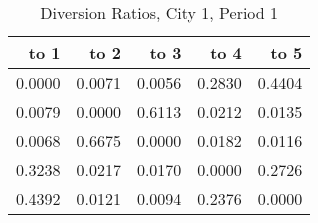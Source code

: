\begin{table}[htbp]
    \centering
    \caption{Diversion Ratios, City 1, Period 1}
    \label{tab:q9_diversion_city1_period1}
\toprule
\begin{tabular}{rrrrr}
\toprule
to 1 & to 2 & to 3 & to 4 & to 5 \\
\midrule
\midrule
0.0000 & 0.0071 & 0.0056 & 0.2830 & 0.4404 \\
0.0079 & 0.0000 & 0.6113 & 0.0212 & 0.0135 \\
0.0068 & 0.6675 & 0.0000 & 0.0182 & 0.0116 \\
0.3238 & 0.0217 & 0.0170 & 0.0000 & 0.2726 \\
0.4392 & 0.0121 & 0.0094 & 0.2376 & 0.0000 \\
\bottomrule
\bottomrule
\end{tabular}

\end{table}
